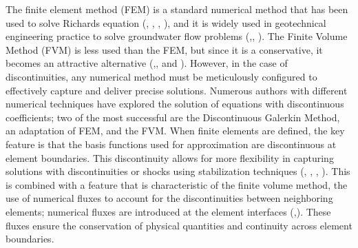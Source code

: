 \documentclass[a4paper,fleqn]{cas-sc}
\begin{document}
The finite element method (FEM) is a standard numerical method that has been used to solve Richards equation (\cite{chen2008numerical}, \cite{fredlund2012}, \cite{venkatesh2016distribution}, \cite{luo2021isoparametric}), and it is widely used in geotechnical engineering practice to solve groundwater flow problems (\cite{galavi2010groundwater},\cite{desai2013advanced}, \cite{geo2022heat}). The Finite Volume Method (FVM) is less used than the FEM, but since it is a conservative, it becomes an attractive alternative (\cite{pour2011numerical},\cite{caviedes2013verification}, and \cite{deng2017saturated}). However, in the case of discontinuities, any numerical method must be meticulously configured to effectively capture and deliver precise solutions. Numerous authors with different numerical techniques have explored the solution of equations with discontinuous coefficients; two of the most successful are the Discontinuous Galerkin Method, an adaptation of FEM, and the FVM. When finite elements are defined, the key feature is that the basis functions used for approximation are discontinuous at element boundaries. This discontinuity allows for more flexibility in capturing solutions with discontinuities or shocks using stabilization techniques (\cite{arnold2000discontinuous}, \cite{brezzi2005mixed}, \cite{arnold2005family}, \cite{cockburn2012discontinuous}). This is combined with a feature that is characteristic of the finite volume method, the use of numerical fluxes to account for the discontinuities between neighboring elements; numerical fluxes are introduced at the element interfaces (\cite{ewing2001modified},\cite{boyer2008finite}). These fluxes ensure the conservation of physical quantities and continuity across element boundaries.
\end{document}

